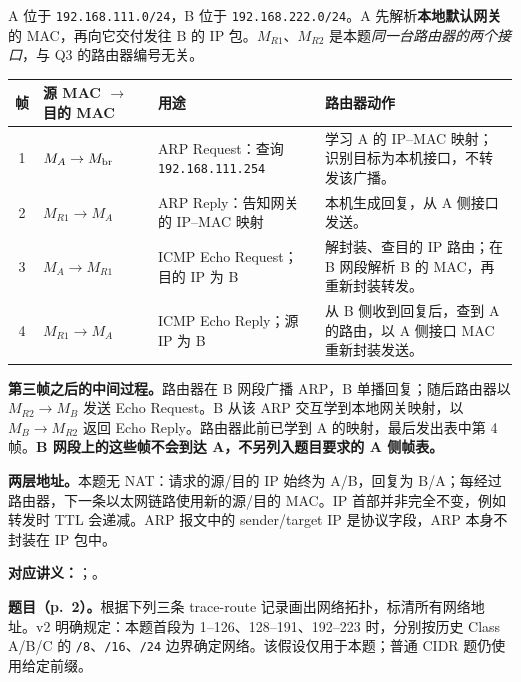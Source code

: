 \begin{checkedsolution}
A 位于 \texttt{192.168.111.0/24}，B 位于 \texttt{192.168.222.0/24}。A 先解析\textbf{本地默认网关}的 MAC，再向它交付发往 B 的 IP 包。$M_{R1}$、$M_{R2}$ 是本题\emph{同一台路由器的两个接口}，与 Q3 的路由器编号无关。

\begin{center}
\small
\begin{tabularx}{\textwidth}{@{}cl>{\raggedright\arraybackslash}p{4.6cm}X@{}}
\toprule
帧 & 源 MAC $\to$ 目的 MAC & 用途 & 路由器动作 \\
\midrule
1 & $M_A\to M_{\rm br}$ & ARP Request：查询 \texttt{192.168.111.254} & 学习 A 的 IP--MAC 映射；识别目标为本机接口，不转发该广播。\\
2 & $M_{R1}\to M_A$ & ARP Reply：告知网关的 IP--MAC 映射 & 本机生成回复，从 A 侧接口发送。\\
3 & $M_A\to M_{R1}$ & ICMP Echo Request；目的 IP 为 B & 解封装、查目的 IP 路由；在 B 网段解析 B 的 MAC，再重新封装转发。\\
4 & $M_{R1}\to M_A$ & ICMP Echo Reply；源 IP 为 B & 从 B 侧收到回复后，查到 A 的路由，以 A 侧接口 MAC 重新封装发送。\\
\bottomrule
\end{tabularx}
\end{center}

\textbf{第三帧之后的中间过程。}路由器在 B 网段广播 ARP，B 单播回复；随后路由器以 $M_{R2}\to M_B$ 发送 Echo Request。B 从该 ARP 交互学到本地网关映射，以 $M_B\to M_{R2}$ 返回 Echo Reply。路由器此前已学到 A 的映射，最后发出表中第 4 帧。\textbf{B 网段上的这些帧不会到达 A，不另列入题目要求的 A 侧帧表。}

\textbf{两层地址。}本题无 NAT：请求的源/目的 IP 始终为 A/B，回复为 B/A；每经过路由器，下一条以太网链路使用新的源/目的 MAC。IP 首部并非完全不变，例如转发时 TTL 会递减。ARP 报文中的 sender/target IP 是协议字段，ARP 本身不封装在 IP 包中。
\end{checkedsolution}

\textbf{对应讲义：}；。

\textbf{题目（p.~2）。}根据下列三条 trace-route 记录画出网络拓扑，标清所有网络地址。v2 明确规定：本题首段为 1--126、128--191、192--223 时，分别按历史 Class A/B/C 的 \texttt{/8}、\texttt{/16}、\texttt{/24} 边界确定网络。该假设仅用于本题；普通 CIDR 题仍使用给定前缀。

